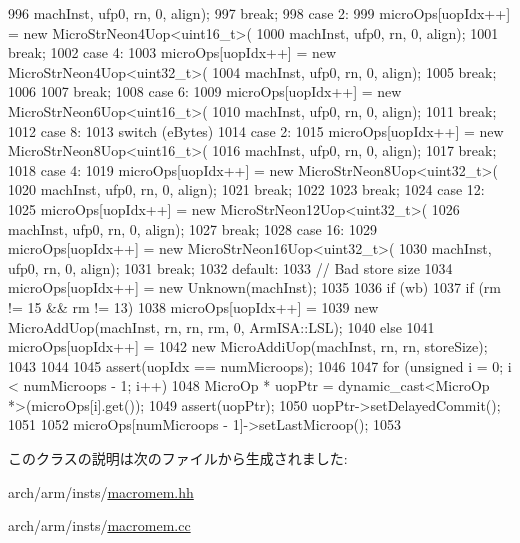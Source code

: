 \begin{DoxyCode}
{{{996                     machInst, ufp0, rn, 0, align);
997             break;
998           case 2:
999             microOps[uopIdx++] = new MicroStrNeon4Uop<uint16_t>(
1000                     machInst, ufp0, rn, 0, align);
1001             break;
1002           case 4:
1003             microOps[uopIdx++] = new MicroStrNeon4Uop<uint32_t>(
1004                     machInst, ufp0, rn, 0, align);
1005             break;
1006         }
1007         break;
1008       case 6:
1009         microOps[uopIdx++] = new MicroStrNeon6Uop<uint16_t>(
1010                 machInst, ufp0, rn, 0, align);
1011         break;
1012       case 8:
1013         switch (eBytes) {
1014           case 2:
1015             microOps[uopIdx++] = new MicroStrNeon8Uop<uint16_t>(
1016                     machInst, ufp0, rn, 0, align);
1017             break;
1018           case 4:
1019             microOps[uopIdx++] = new MicroStrNeon8Uop<uint32_t>(
1020                     machInst, ufp0, rn, 0, align);
1021             break;
1022         }
1023         break;
1024       case 12:
1025         microOps[uopIdx++] = new MicroStrNeon12Uop<uint32_t>(
1026                 machInst, ufp0, rn, 0, align);
1027         break;
1028       case 16:
1029         microOps[uopIdx++] = new MicroStrNeon16Uop<uint32_t>(
1030                 machInst, ufp0, rn, 0, align);
1031         break;
1032       default:
1033         // Bad store size
1034         microOps[uopIdx++] = new Unknown(machInst);
1035     }
1036     if (wb) {
1037         if (rm != 15 && rm != 13) {
1038             microOps[uopIdx++] =
1039                 new MicroAddUop(machInst, rn, rn, rm, 0, ArmISA::LSL);
1040         } else {
1041             microOps[uopIdx++] =
1042                 new MicroAddiUop(machInst, rn, rn, storeSize);
1043         }
1044     }
1045     assert(uopIdx == numMicroops);
1046 
1047     for (unsigned i = 0; i < numMicroops - 1; i++) {
1048         MicroOp * uopPtr = dynamic_cast<MicroOp *>(microOps[i].get());
1049         assert(uopPtr);
1050         uopPtr->setDelayedCommit();
1051     }
1052     microOps[numMicroops - 1]->setLastMicroop();
1053 }

\end{DoxyCode}


このクラスの説明は次のファイルから生成されました:\begin{DoxyCompactItemize}
\item 
arch/arm/insts/\hyperlink{macromem_8hh}{macromem.hh}\item 
arch/arm/insts/\hyperlink{macromem_8cc}{macromem.cc}\end{DoxyCompactItemize}
